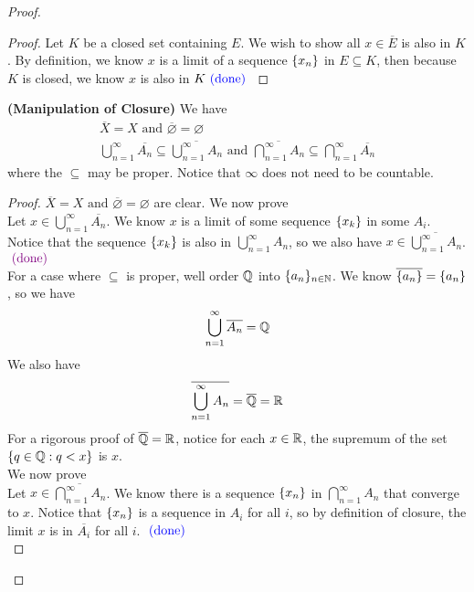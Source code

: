 \documentclass{report}
\begin{document}
\begin{proof}
\begin{proof}
Let $K$ be a closed set containing  $E$. We wish to show all $x\in \overline{E}$ is also in $K$. By definition, we know  $x$ is a limit of a sequence  $\{ x_n \}$ in $E\subseteq K$, then because $K$ is closed, we know $x$ is also in $K\textcolor{blue}{\text{ (done) }}$  
\end{proof}
\begin{theorem}
\label{3.2.3}
\textbf{(Manipulation of Closure)} We have
\begin{gather}
\overline{X}=X\text{ and }\overline{\varnothing}=\varnothing\\
\bigcup_{n=1}^\infty \overline{A_n}\subseteq \overline{\bigcup_{n=1}^\infty A_n}\text{ and }\overline{\bigcap_{n=1}^\infty A_n}\subseteq \bigcap_{n=1}^\infty \overline{A_n} 
\end{gather}
where the $\subseteq$ may be proper. Notice that $\infty$ does not need to be countable. 
\end{theorem}
\begin{proof}
$\overline{X}=X\text{ and }\overline{\varnothing}=\varnothing$ are clear. We now prove  \\

Let $x\in \bigcup_{n=1}^\infty \overline{A_n}$. We know $x$ is a limit of some sequence $\{ x_k \}$ in some $A_i$. Notice that the sequence $\{ x_k \}$ is also in $\bigcup_{n=1}^\infty A_n$, so we also have $x\in \overline{\bigcup_{n=1}^\infty A_n}$. $\textcolor{violet}{\text{ (done) }}$\\

For a case where $\subseteq$ is proper, well order $\mathbb{Q}$ into $\{ a_n \}_{n\in\mathbb{N}}$. We know $\overline{\{ a_n \}}=\{ a_n \}$, so we have
\begin{equation}
\bigcup _{n=1}^\infty \overline{A_n}=\mathbb{Q} 
\end{equation}
We also have
\begin{equation}
\overline{\bigcup_{n=1}^\infty A_n}=\overline{\mathbb{Q}}=\mathbb{R}
\end{equation}
For a rigorous proof of $\overline{\mathbb{Q}}=\mathbb{R}$, notice for each $x\in\mathbb{R}$, the supremum of the set $\{ q\in\mathbb{Q}: q<x \}$ is $x$.\\

We now prove \\

Let $x\in \overline{\bigcap _{n=1}^\infty A_n}$. We know there is a sequence $\{ x_n \}$ in $\bigcap _{n=1}^\infty A_n$ that converge to $x$. Notice that $\{ x_n \}$ is a sequence in $A_i$ for all  $i$, so by definition of closure, the limit  $x$ is in  $\overline{A_i}$ for all $i$. $\textcolor{blue}{\text{ (done) }}$\\


\end{proof}
\end{proof}
\end{document}
